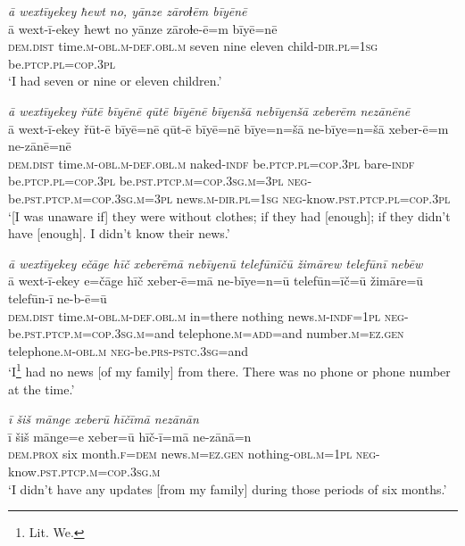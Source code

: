\ea \label{ŽM.26}
\textit{ā wextīyekey ħewt no, yānze zāroɫēm bīyēnē} \\ 
\gll ā wext-ī-ekey ħewt no yānze zāroɫe-ē=m bīyē=nē \\ 
 \textsc{dem.dist} time\textsc{.m}\textsc{-obl}\textsc{.m}\textsc{-def}\textsc{.obl}\textsc{.m} seven nine eleven child\textsc{-dir}\textsc{.pl}\textsc{=\textsc{1sg}} be\textsc{.ptcp}\textsc{.pl}\textsc{=cop}\textsc{.3pl} \\ 
\glt `I had seven or nine or eleven children.'
\z 
 
\ea \label{ŽM.30}
\textit{ā wextīyekey řūtē bīyēnē qūtē bīyēnē bīyenšā nebīyenšā xeberēm nezānēnē} \\ 
\gll ā wext-ī-ekey řūt-ē bīyē=nē qūt-ē bīyē=nē bīye=n=šā ne-bīye=n=šā xeber-ē=m ne-zānē=nē \\ 
 \textsc{dem.dist} time\textsc{.m}\textsc{-obl}\textsc{.m}\textsc{-def}\textsc{.obl}\textsc{.m} naked\textsc{-indf} be\textsc{.ptcp}\textsc{.pl}\textsc{=cop}\textsc{.3pl} bare\textsc{-indf} be\textsc{.ptcp}\textsc{.pl}\textsc{=cop}\textsc{.3pl} be\textsc{.pst}\textsc{.ptcp}\textsc{.m}\textsc{=cop}\textsc{.3sg}\textsc{.m}\textsc{=3pl} \textsc{neg-}be\textsc{.pst}\textsc{.ptcp}\textsc{.m}\textsc{=cop}\textsc{.3sg}\textsc{.m}\textsc{=3pl} news\textsc{.m}\textsc{-dir}\textsc{.pl}\textsc{=\textsc{1sg}} \textsc{neg-}know\textsc{.pst}\textsc{.ptcp}\textsc{.pl}\textsc{=cop}\textsc{.3pl} \\ 
\glt `[I was unaware if] they were without clothes; if they had [enough]; if they didn’t have [enough]. I didn't know their news.'
\z 
 
\ea \label{ŽM.32}
\textit{ā wextīyekey ečāge hīč xeberēmā nebīyenū telefūnīčū žimārew telefūnī nebēw} \\ 
\gll ā wext-ī-ekey e=čāge hīč xeber-ē=mā ne-bīye=n=ū telefūn=īč=ū žimāre=ū telefūn-ī ne-b-ē=ū \\ 
 \textsc{dem.dist} time\textsc{.m}\textsc{-obl}\textsc{.m}\textsc{-def}\textsc{.obl}\textsc{.m} in=there nothing news\textsc{.m}\textsc{-indf}\textsc{=\textsc{1pl}} \textsc{neg-}be\textsc{.pst}\textsc{.ptcp}\textsc{.m}\textsc{=cop}\textsc{.3sg}\textsc{.m}=and telephone\textsc{.m}\textsc{=add}=and number\textsc{.m}\textsc{=ez.gen} telephone\textsc{.m}\textsc{-obl}\textsc{.m} \textsc{neg-}be\textsc{.prs}\textsc{-pstc}\textsc{.3sg}=and \\ 
\glt `I\footnote{Lit. We.}  had no news [of my family] from there. There was no phone or phone number at the time.'
\z 
 
\ea \label{ŽM.36}
\textit{ī šiš mānge xeberū hīčīmā nezānān} \\ 
\gll ī šiš mānge=e xeber=ū hīč-ī=mā ne-zānā=n \\ 
 \textsc{dem.prox} six month\textsc{.f}\textsc{=dem} news\textsc{.m}\textsc{=ez.gen} nothing\textsc{-obl}\textsc{.m}\textsc{=\textsc{1pl}} \textsc{neg-}know\textsc{.pst}\textsc{.ptcp}\textsc{.m}\textsc{=cop}\textsc{.3sg}\textsc{.m} \\ 
\glt `I didn’t have any updates [from my family] during those periods of six months.'
\z 
 
